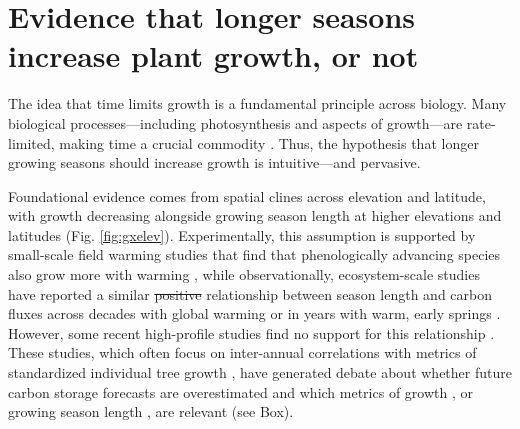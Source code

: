 \documentclass[11pt]{article}
\newcommand{\R}[1]{\label{#1}\linelabel{#1}}
\providecommand{\DIFdeltex}[1]{{\protect\color{red}\sout{#1}}}                      %
\providecommand{\DIFdelbegin}{} %
\providecommand{\DIFdelend}{} %
\providecommand{\DIFdel}[1]{\texorpdfstring{\DIFdeltex{#1}}{}} %
\newcommand{\DIFscaledelfig}{0.5}
\newlength{\DIFdelgraphicswidth} %
\newlength{\DIFdelgraphicsheight} %
\newcommand{\DIFdelincludegraphics}[2][]{%
\sbox{\DIFdelgraphicsbox}{\DIFOincludegraphics[#1]{#2}}%
\settoboxwidth{\DIFdelgraphicswidth}{\DIFdelgraphicsbox} %
\settoboxtotalheight{\DIFdelgraphicsheight}{\DIFdelgraphicsbox} %
\scalebox{\DIFscaledelfig}{%
\parbox[b]{\DIFdelgraphicswidth}{\usebox{\DIFdelgraphicsbox}\\[-\baselineskip] \rule{\DIFdelgraphicswidth}{0em}}\llap{\resizebox{\DIFdelgraphicswidth}{\DIFdelgraphicsheight}{%
\setlength{\unitlength}{\DIFdelgraphicswidth}%
\begin{picture}(1,1)%
\thicklines\linethickness{2pt} %
{\color[rgb]{1,0,0}\put(0,0){\framebox(1,1){}}}%
{\color[rgb]{1,0,0}\put(0,0){\line( 1,1){1}}}%
{\color[rgb]{1,0,0}\put(0,1){\line(1,-1){1}}}%
\end{picture}%
}\hspace*{3pt}}} %
} %
\DeclareRobustCommand{\DIFdelbegin}{\DIFOdelbegin \let\includegraphics\DIFdelincludegraphics} %
\DeclareRobustCommand{\DIFdelend}{\DIFOaddend \let\includegraphics\DIFOincludegraphics} %
\begin{document}
\section*{Evidence that longer seasons increase plant growth, or not} %
The idea that time limits growth is a fundamental principle across biology. Many biological processes---including photosynthesis and aspects of growth---are rate-limited, making time a crucial commodity \citep{nobel1983biophysical,cosgrove2005growth,hilty2021plant}. Thus, the hypothesis that longer growing seasons should increase growth is intuitive---and pervasive. 

Foundational evidence comes from spatial clines across elevation and latitude, with growth decreasing alongside growing season length at higher elevations and latitudes (Fig. \ref{fig:gxelev}). Experimentally, this assumption is supported by small-scale field warming studies that find that phenologically advancing species also grow more with warming \citep[][]{Cleland:2012}, while observationally, ecosystem-scale studies have reported a similar \DIFdelbegin \DIFdel{positive }\DIFdelend relationship between season length and carbon fluxes across decades with global warming \citep{keenan2014net} or in years with warm, early springs \citep{chen1999effects}. However, some recent high-profile studies find no support for this relationship \citep{dow2022warm}. These studies, which often focus on inter-annual correlations with metrics of standardized individual tree growth \citep{dow2022warm,silvestro2023longer}, have generated debate about whether future carbon storage forecasts are overestimated and which metrics of growth \citep{green2022limits}, or growing season length \citep{korner2023four}, are relevant (see Box).
\DIFdelbegin %
\DIFdelend 
\end{document}
